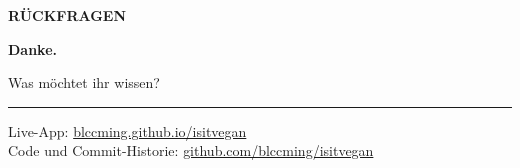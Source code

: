 \documentclass[aspectratio=169,11pt]{beamer}
\begin{document}
\begin{frame}[plain]
  \vspace*{1.1cm}
  {\color{Akzent}\small\bfseries RÜCKFRAGEN}

  \vspace{0.5cm}
  {\Huge\bfseries Danke.}

  \vspace{0.3cm}
  {\Large Was möchtet ihr wissen?}

  \vspace{1cm}
  {\color{Linie}\rule{\linewidth}{0.6pt}}

  \vspace{0.5cm}
  \small
  Live-App: \href{https://blccming.github.io/isitvegan/}{blccming.github.io/isitvegan}\\
  Code und Commit-Historie: \href{https://github.com/blccming/isitvegan}{github.com/blccming/isitvegan}
\end{frame}
\end{document}

